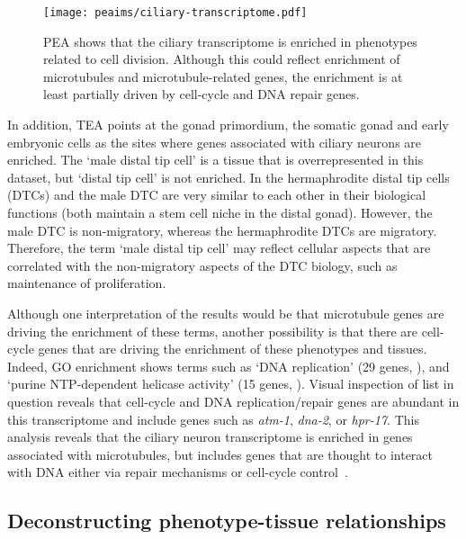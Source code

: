 \begin{figure}[htbp]
  \renewcommand{\familydefault}{\sfdefault}\normalfont{}
  \centering
  \texttt{[image: peaims/ciliary-transcriptome.pdf]}
  \caption{PEA shows that the ciliary transcriptome is enriched in phenotypes
  related to cell division. Although this could reflect enrichment of
  microtubules and microtubule-related genes, the enrichment is at least
  partially driven by cell-cycle and DNA repair genes.}
\label{fig:cilia}
\end{figure}


In addition, TEA points at the \cel{} gonad primordium, the somatic gonad
and early embryonic cells as the sites where genes associated with ciliary neurons
are enriched. The `male distal tip cell' is a tissue
that is overrepresented in this dataset, but `distal tip cell' is not enriched.
In \cel{} the hermaphrodite distal tip cells (DTCs) and the male DTC are very
similar to each other in their biological functions (both maintain a stem cell
niche in the distal gonad). However, the male DTC is non-migratory, whereas the
hermaphrodite DTCs are migratory. Therefore, the term `male distal tip cell'
may reflect cellular aspects that are correlated with the non-migratory aspects
of the DTC biology, such as maintenance of proliferation.

Although one interpretation of the results would be that microtubule genes
are driving the enrichment of these terms, another possibility is that
there are cell-cycle genes that are driving the enrichment of these phenotypes
and tissues. Indeed, GO enrichment shows terms such as `DNA replication' (29
genes, ), and `purine NTP-dependent helicase activity'
(15 genes, ). Visual inspection of list in question reveals that
cell-cycle and DNA replication/repair genes are abundant in this transcriptome
and include genes such as \emph{atm-1}, \emph{dna-2}, or \emph{hpr-17}. This
analysis reveals that the ciliary neuron transcriptome is enriched in
genes associated with microtubules, but includes genes that are thought to
interact with DNA either via repair mechanisms or cell-cycle
control~\citep{Hofmann2000,Lee2003a,Bailly2010}.

\subsection*{Deconstructing phenotype-tissue relationships}
